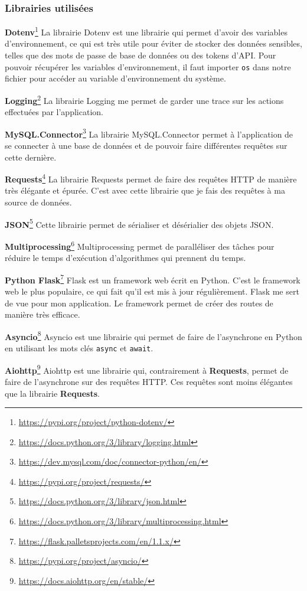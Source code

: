 \documentclass[a4paper,14pt]{extarticle}
\begin{document}
{\subsubsection{Librairies utilisées}

\textbf{Dotenv}\footnote{\url{https://pypi.org/project/python-dotenv/}}
La librairie Dotenv est une librairie qui permet d'avoir des variables d'environnement, ce qui est très utile pour éviter de stocker des données sensibles, telles que des mots de passe de base de données ou des tokens d'API. Pour pouvoir récupérer les variables d'environnement, il faut importer \texttt{os} dans notre fichier pour accéder au variable d'environnement du système.

\textbf{Logging}\footnote{\url{https://docs.python.org/3/library/logging.html}}
La librairie Logging me permet de garder une trace sur les actions effectuées par l'application. 

\textbf{MySQL.Connector}\footnote{\url{https://dev.mysql.com/doc/connector-python/en/}}
La librairie MySQL.Connector permet à l'application de se connecter à une base de données et de pouvoir faire différentes requêtes sur cette dernière. 

\textbf{Requests}\footnote{\url{https://pypi.org/project/requests/}}
La librairie Requests permet de faire des requêtes HTTP de manière très élégante et épurée. C'est avec cette librairie que je fais des requêtes à ma source de données. 

\textbf{JSON}\footnote{\url{https://docs.python.org/3/library/json.html}}
Cette librairie permet de sérialiser et désérialier des objets JSON. 

\textbf{Multiprocessing}\footnote{\url{https://docs.python.org/3/library/multiprocessing.html}}
Multiprocessing permet de paralléliser des tâches pour réduire le temps d'exécution d'algorithmes qui prennent du temps.

\textbf{Python Flask}\footnote{\url{https://flask.palletsprojects.com/en/1.1.x/}}
Flask est un framework web écrit en Python. C'est le framework web le plus populaire, ce qui fait qu'il est mis à jour régulièrement. Flask me sert de vue pour mon application. Le framework permet de créer des routes de manière très efficace.

\textbf{Asyncio}\footnote{\url{https://pypi.org/project/asyncio/}}
Asyncio est une librairie qui permet de faire de l'asynchrone en Python en utilisant les mots clés \texttt{async} et \texttt{await}.

\textbf{Aiohttp}\footnote{\url{https://docs.aiohttp.org/en/stable/}}
Aiohttp est une librairie qui, contrairement à \textbf{Requests}, permet de faire de l'asynchrone sur des requêtes HTTP. Ces requêtes sont moins élégantes que la librairie \textbf{Requests}.

}
\end{document}
